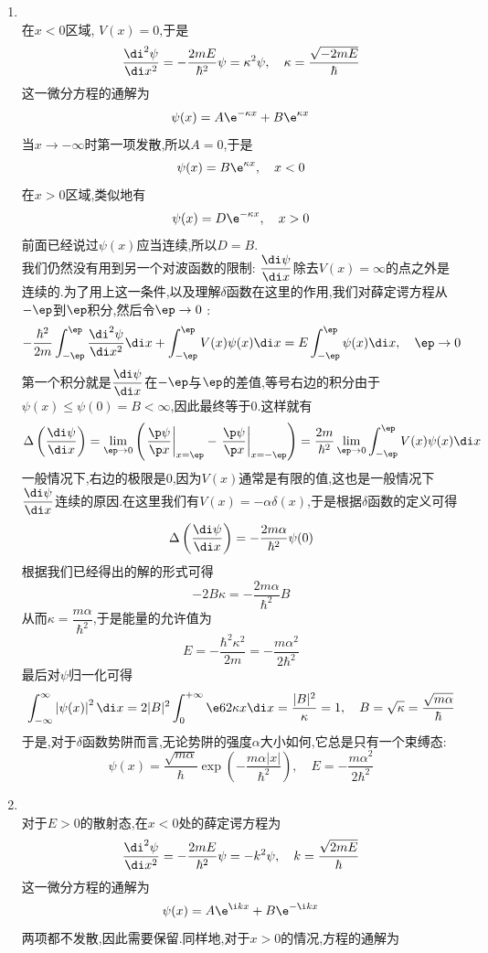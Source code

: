 \documentclass{ctexart}
\begin{document}
\begin{enumerate}[label=\tbf{\arabic*.},leftmargin=*]
    \item {}\\
    在$x<0$区域, $V(x)=0$,于是
    \[\dfrac{\di^2\psi}{\di x^2}=-\dfrac{2mE}{\hbar^2}\psi=\kappa^2\psi,\quad\kappa=\dfrac{\sqrt{-2mE}}{\hbar}\]
    这一微分方程的通解为
    \[\psi(x)=A\e^{-\kappa x}+B\e^{\kappa x}\]
    当$x\to-\infty$时第一项发散,所以$A=0$,于是
    \[\psi(x)=B\e^{\kappa x},\quad x<0\]
    在$x>0$区域,类似地有
    \[\psi(x)=D\e^{-\kappa x},\quad x>0\]
    前面已经说过$\psi(x)$应当连续,所以$D=B$.\\
    我们仍然没有用到另一个对波函数的限制: $\dfrac{\di\psi}{\di x}$除去$V(x)=\infty$的点之外是连续的.为了用上这一条件,以及理解$\delta$函数在这里的作用,我们对薛定谔方程从$-\ep$到$\ep$积分,然后令$\ep\to0$ :
    \[-\dfrac{\hbar^2}{2m}\int_{-\ep}^{\ep}\dfrac{\di^2\psi}{\di x^2}\di x+\int_{-\ep}^{\ep}V(x)\psi(x)\di x=E\int_{-\ep}^{\ep}\psi(x)\di x,\quad\ep\to0\]
    第一个积分就是$\dfrac{\di\psi}{\di x}$在$-\ep$与$\ep$的差值,等号右边的积分由于$\psi(x)\leq\psi(0)=B<\infty$,因此最终等于$0$.这样就有
    \[\Delta\left(\dfrac{\di\psi}{\di x}\right)=\lim_{\ep\to0}\left(\left.\dfrac{\p\psi}{\p x}\right|_{x=\ep}-\left.\dfrac{\p\psi}{\p x}\right|_{x=-\ep}\right)=\dfrac{2m}{\hbar^2}\lim_{\ep\to0}\int_{-\ep}^{\ep}V(x)\psi(x)\di x\]
    一般情况下,右边的极限是$0$,因为$V(x)$通常是有限的值,这也是一般情况下$\dfrac{\di\psi}{\di x}$连续的原因.在这里我们有$V(x)=-\alpha\delta(x)$,于是根据$\delta$函数的定义可得
    \[\Delta\left(\dfrac{\di\psi}{\di x}\right)=-\dfrac{2m\alpha}{\hbar^2}\psi(0)\]
    根据我们已经得出的解的形式可得
    \[-2B\kappa=-\dfrac{2m\alpha}{\hbar^2}B\]
    从而$\kappa=\dfrac{m\alpha}{\hbar^2}$,于是能量的允许值为
    \[E=-\dfrac{\hbar^2\kappa^2}{2m}=-\dfrac{m\alpha^2}{2\hbar^2}\]
    最后对$\psi$归一化可得
    \[\int_{-\infty}^{\infty}\left|\psi(x)\right|^2\di x=2|B|^2\int_{0}^{+\infty}\e6{2\kappa x}\di x=\dfrac{|B|^2}{\kappa}=1,\quad B=\sqrt{\kappa}=\dfrac{\sqrt{m\alpha}}{\hbar}\]
    于是,对于$\delta$函数势阱而言,无论势阱的强度$\alpha$大小如何,它总是只有一个束缚态:
    \[\psi(x)=\dfrac{\sqrt{m\alpha}}{\hbar}\exp\left(-\dfrac{m\alpha|x|}{\hbar^2}\right),\quad E=-\dfrac{m\alpha^2}{2\hbar^2}\]
    \item {}\\
    对于$E>0$的散射态,在$x<0$处的薛定谔方程为
    \[\dfrac{\di^2\psi}{\di x^2}=-\dfrac{2mE}{\hbar^2}\psi=-k^2\psi,\quad k=\dfrac{\sqrt{2mE}}{\hbar}\]
    这一微分方程的通解为
    \[\psi(x)=A\e^{\i kx}+B\e^{-\i kx}\]
    两项都不发散,因此需要保留.同样地,对于$x>0$的情况,方程的通解为

\end{enumerate}
\end{document}
